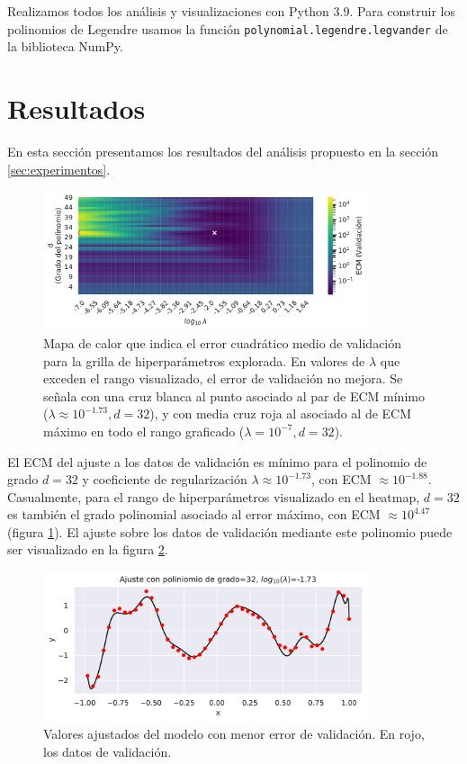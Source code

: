 \documentclass{article}
\begin{document}
Realizamos todos los análisis y visualizaciones con Python 3.9. Para construir los polinomios de Legendre usamos la función \texttt{polynomial.legendre.legvander} de la biblioteca NumPy.



\section{Resultados} \label{sec:resultados}

En esta sección presentamos los resultados del análisis propuesto en la sección \ref{sec:experimentos}.

\begin{figure}[!ht]
    \centering
    \includegraphics[width=0.85\textwidth]{img/heatmap.pdf}
    \caption{
        Mapa de calor que indica el error cuadrático medio de validación para la grilla de hiperparámetros explorada. En valores de $\lambda$ que exceden el rango visualizado, el error de validación no mejora. Se señala con una cruz blanca al punto asociado al par de ECM mínimo ($\lambda\approx 10^{-1.73}, d=32$), y con media cruz roja al asociado al de ECM máximo en todo el rango graficado ($\lambda=10^{-7}, d=32$).
    }
    \label{fig:heatmap}
\end{figure}

\clearpage
El ECM del ajuste a los datos de validación es mínimo para el polinomio de grado $d=32$ y coeficiente de regularización $\lambda \approx 10^{-1.73}$, con ECM $\approx 10^{-1.88}$. Casualmente, para el rango de hiperparámetros visualizado en el heatmap, $d=32$ es también el grado polinomial asociado al error máximo, con ECM $\approx 10^{4.47}$ (figura \ref{fig:heatmap}). El ajuste sobre los datos de validación mediante este polinomio puede ser visualizado en la figura \ref{fig:ajuste_mejor}.

\begin{figure}[!ht]
    \centering
    \includegraphics[width=0.85\textwidth]{img/ajuste_mejor.pdf}
    \caption{
        Valores ajustados del modelo con menor error de validación. En rojo, los datos de validación.
    } 
    \label{fig:ajuste_mejor}
\end{figure}
\end{document}
